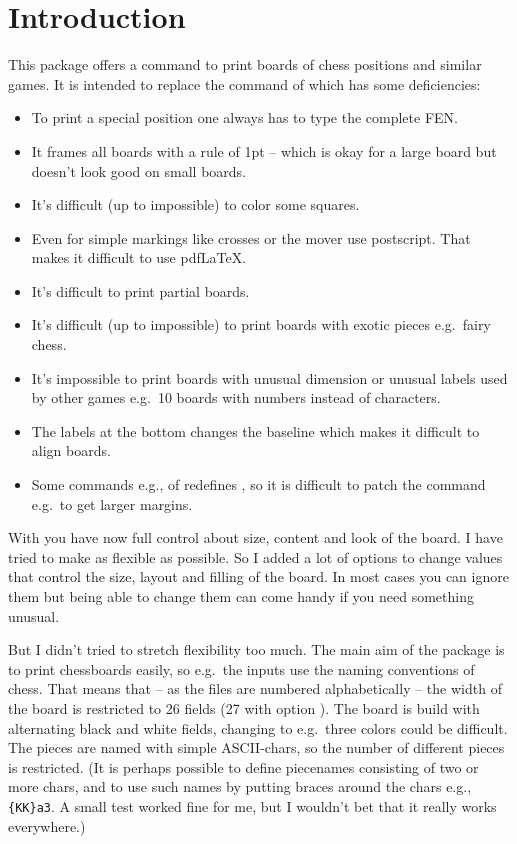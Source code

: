 \documentclass[pagesize,parskip=half-,fontsize=12pt]{scrartcl}
\begin{document}
\section{Introduction}
 \DescribeMacro{\chessboard} This package
offers a command \keyoarg{} to print boards of chess
positions and similar games. It is intended to replace the
 command of \skaksty which has some deficiencies:
\begin{itemize}
\item To print a special position one always has to type the
complete FEN.
\item It frames all boards with a  rule of 1pt -- which is okay
for a large board but doesn't look good on small boards.
\item It's difficult (up to impossible) to color some squares.
\item Even for simple markings like crosses or the mover \skaksty use
postscript. That makes it difficult to use pdf\LaTeX.
\item It's difficult to print partial boards.
\item It's difficult (up to impossible) to print boards with exotic
pieces e.g.\ fairy chess.
\item It's impossible to print boards with unusual dimension or unusual labels used by other games e.g.\
10 boards with numbers instead of characters.
\item The labels at the bottom changes the baseline which makes it
difficult to align boards.
\item Some commands e.g.,  of  \skaksty redefines , so it
is difficult to patch the command e.g.\ to get larger margins.
\end{itemize}


With \pchessboard you have now full control about size, content and
look of the board. I have tried to make \cs{chessboard} as flexible
as possible. So I added a lot of options to change values that
control the size, layout and filling of the board. In most cases you
can ignore them but being able to change them can come handy if you
need something unusual.

But I didn't tried to stretch flexibility too much. The main aim of
the package is to print chessboards easily, so e.g.\ the inputs use
the naming conventions of chess. That means that -- as the files are
numbered alphabetically -- the width of the board is restricted to 26
fields (27 with option \key{zero}). The board is build with
alternating black and white fields, changing to e.g.\ three colors
could be difficult. The pieces are named with simple ASCII-chars, so
the number of different pieces is restricted. (It is perhaps possible
to define piecenames consisting of two or more chars, and to use such
names by putting braces around the chars e.g.,
\verb+{KK}a3+.  A small test worked fine for me, but I wouldn't bet
that it really works everywhere.)
\end{document}
